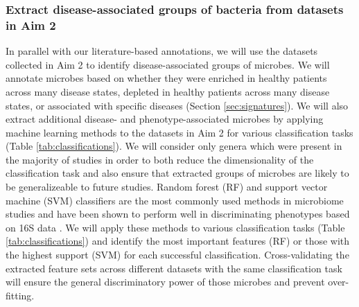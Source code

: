 \documentclass[12pt]{article}
\begin{document}
\subsubsection{Extract disease-associated groups of bacteria from datasets in Aim 2}
In parallel with our literature-based annotations, 
we will use the datasets collected in Aim 2 to identify
disease-associated groups of microbes. We will annotate microbes 
based on whether they were enriched in healthy patients
across many disease states, depleted in healthy patients across
many disease states, or associated with specific diseases (Section \ref{sec:signatures}). 
We will also extract additional disease- and phenotype-associated microbes by 
applying machine learning methods to the datasets in Aim 2 for
various classification tasks (Table \ref{tab:classifications}). 
We will consider only genera which were present in the majority of studies 
in order to both reduce the dimensionality of the classification 
task and also ensure that extracted groups of microbes
are likely to be generalizeable to future studies. Random forest (RF) and support
vector machine (SVM) classifiers are the most commonly used methods in
microbiome studies and have been shown to perform well in discriminating
phenotypes based on 16S data \cite{ibd-papa, knights-supervised-2010, pasolli-meta_analysis-2016}. 
We will apply these methods to various classification tasks (Table \ref{tab:classifications})
and identify the most important features (RF) or those with the highest support (SVM)
for each successful classification.
Cross-validating the extracted feature sets across different datasets with the same
classification task will ensure the general discriminatory 
power of those microbes and prevent over-fitting.
\end{document}
